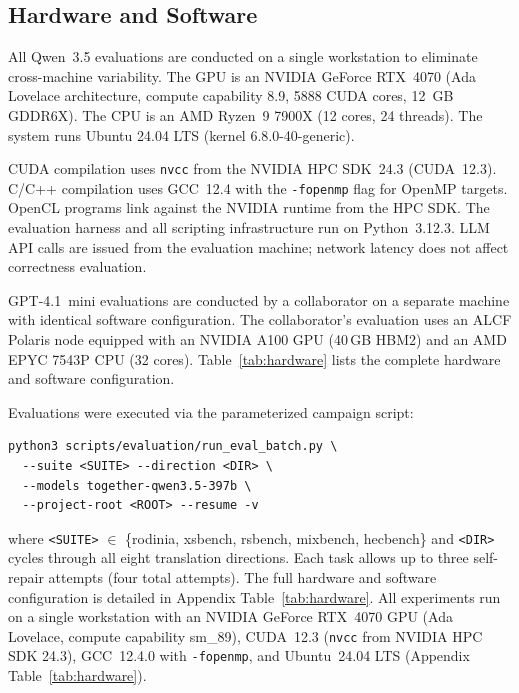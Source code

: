 \documentclass{article}
\begin{document}
\subsection{Hardware and Software}
\label{sec:hardware}

All Qwen~3.5 evaluations are conducted on a single workstation to eliminate cross-machine variability. The GPU is an NVIDIA GeForce RTX~4070 (Ada Lovelace architecture, compute capability 8.9, 5888 CUDA cores, 12~GB GDDR6X). The CPU is an AMD Ryzen~9 7900X (12 cores, 24 threads). The system runs Ubuntu 24.04 LTS (kernel 6.8.0-40-generic).

CUDA compilation uses \texttt{nvcc} from the NVIDIA HPC SDK~24.3 (CUDA~12.3). C/C++ compilation uses GCC~12.4 with the \texttt{-fopenmp} flag for OpenMP targets. OpenCL programs link against the NVIDIA runtime from the HPC SDK. The evaluation harness and all scripting infrastructure run on Python~3.12.3. LLM API calls are issued from the evaluation machine; network latency does not affect correctness evaluation.

GPT-4.1~mini evaluations are conducted by a collaborator on a separate machine with identical software configuration. The collaborator's evaluation uses an ALCF Polaris node equipped with an NVIDIA A100 GPU (40\,GB HBM2) and an AMD EPYC 7543P CPU (32 cores). Table~\ref{tab:hardware} lists the complete hardware and software configuration.

Evaluations were executed via the parameterized campaign script:
\begin{small}
\begin{verbatim}
python3 scripts/evaluation/run_eval_batch.py \
  --suite <SUITE> --direction <DIR> \
  --models together-qwen3.5-397b \
  --project-root <ROOT> --resume -v
\end{verbatim}
\end{small}
\noindent where \texttt{<SUITE>} $\in$ \{rodinia, xsbench, rsbench, mixbench, hecbench\}
and \texttt{<DIR>} cycles through all eight translation directions.
Each task allows up to three self-repair attempts (four total attempts).
The full hardware and software configuration is detailed in Appendix Table~\ref{tab:hardware}.
All experiments run on a single workstation with an NVIDIA GeForce
RTX~4070 GPU (Ada Lovelace, compute capability sm\_89), CUDA~12.3
(\texttt{nvcc} from NVIDIA HPC SDK 24.3), GCC~12.4.0 with
\texttt{-fopenmp}, and Ubuntu~24.04 LTS
(Appendix Table~\ref{tab:hardware}).
\end{document}
